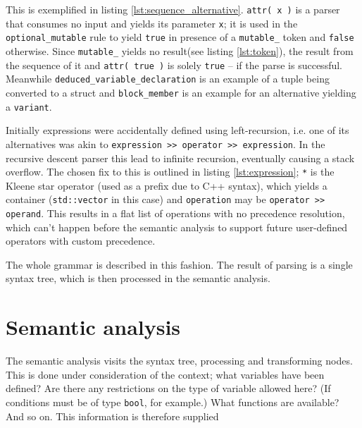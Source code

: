 		This is exemplified in listing \ref{lst:sequence_alternative}. \lstinline$attr( x )$ is a parser that consumes no input and yields its parameter \lstinline$x$; it is used in the \lstinline$optional_mutable$ rule to yield \lstinline$true$ in presence of a \lstinline$mutable_$ token and \lstinline$false$ otherwise. Since \lstinline$mutable_$ yields no result(see listing \ref{lst:token}), the result from the sequence of it and \lstinline$attr( true )$ is solely \lstinline$true$ -- if the parse is successful. Meanwhile \lstinline$deduced_variable_declaration$ is an example of a tuple being converted to a struct and \lstinline$block_member$ is an example for an alternative yielding a \lstinline$variant$.
		
		
		Initially expressions were accidentally defined using left-recursion, i.e. one of its alternatives was akin to \lstinline$expression >> operator >> expression$. In the recursive descent parser this lead to infinite recursion, eventually causing a stack overflow. The chosen fix to this is outlined in listing \ref{lst:expression}; \lstinline$*$ is the Kleene star operator (used as a prefix due to C++ syntax), which yields a container (\lstinline$std::vector$ in this case) and \lstinline$operation$ may be \lstinline$operator >> operand$. This results in a flat list of operations with no precedence resolution, which can't happen before the semantic analysis to support future user-defined operators with custom precedence.
		
		
		The whole grammar is described in this fashion. The result of parsing is a single syntax tree, which is then processed in the semantic analysis.
	
	\section{Semantic analysis}
		
		The semantic analysis visits the syntax tree, processing and transforming nodes. This is done under consideration of the context; what variables have been defined? Are there any restrictions on the type of variable allowed here? (If conditions must be of type \lstinline$bool$, for example.) What functions are available? And so on. This information is therefore supplied 
		
